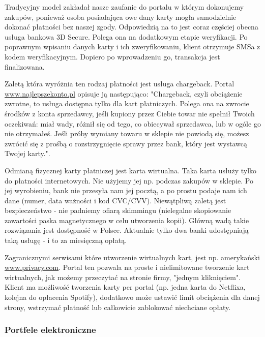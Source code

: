 \documentclass[12pt]{article}
\numberwithin{figure}{section}
\begin{document}
Tradycyjny model zakładał nasze zaufanie do portalu w którym dokonujemy zakupów, ponieważ osoba posiadająca owe dany karty mogła samodzielnie dokonać płatności bez naszej zgody. Odpowiedzią na to jest coraz częściej obecna usługa bankowa 3D Secure. Polega ona na dodatkowym etapie weryfikacji. Po poprawnym wpisaniu danych karty i ich zweryfikowaniu, klient otrzymuje SMSa z kodem weryfikacyjnym. Dopiero po wprowadzeniu go, transakcja jest finalizowana.

Zaletą która wyróżnia ten rodzaj płatności jest usługa chargeback. Portal \url{www.najlepszekonto.pl} opisuje ją następująco: "Chargeback, czyli obciążenie zwrotne, to usługa dostępna tylko dla kart płatniczych. Polega ona na zwrocie środków z konta sprzedawcy, jeśli kupiony przez Ciebie towar nie spełnił Twoich oczekiwań: miał wady, różnił się od tego, co obiecywał sprzedawca, lub w ogóle go nie otrzymałeś. Jeśli próby wymiany towaru w sklepie nie powiodą się, możesz zwrócić się z prośbą o rozstrzygnięcie sprawy przez bank, który jest wystawcą Twojej karty."\cite{chargeback}.

Odmianą fizycznej karty płatniczej jest karta wirtualna. Taka karta usłuży tylko do płatności internetowych. Nie użyjemy jej np. podczas zakupów w sklepie. Po jej wyrobieniu, bank nie przesyła nam jej pocztą, a po prostu podaje nam ich dane (numer, data ważności i kod CVC/CVV). Niewątpliwą zaletą jest bezpieczeństwo - nie padniemy ofiarą skimmingu (nielegalne skopiowanie zawartości paska magnetycznego w celu utworzenia kopii). Główną wadą takie rozwiązania jest dostępność w Polsce. Aktualnie tylko dwa banki udostępniają taką usługę - i to za miesięczną opłatą. 

Zagranicznymi serwisami które utworzenie wirtualnych kart, jest np. amerykański \url{www.privacy.com}. Portal ten pozwala na proste i nielimitowane tworzenie kart wirtualnych, jak możemy przeczytać na stronie firmy, "jednym kliknięciem". Klient ma możliwość tworzenia karty per portal (np. jedna karta do Netflixa, kolejna do opłacenia Spotify), dodatkowo może ustawić limit obciążenia dla danej strony, wstrzymać płatność lub całkowicie zablokować niechciane opłaty. 

\subsubsection{Portfele elektroniczne}
\end{document}
